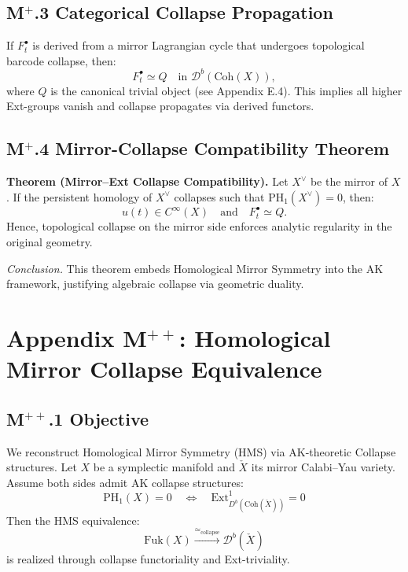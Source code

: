 \documentclass[11pt]{article}
\begin{document}
\begin{axiom}
\begin{axiom}
{{\subsection*{M$^+$.3 Categorical Collapse Propagation}
If \( F^\bullet_t \) is derived from a mirror Lagrangian cycle that undergoes topological barcode collapse, then:
\[
F^\bullet_t \simeq Q \quad \text{in } \mathcal{D}^b(\mathrm{Coh}(X)),
\]
where \( Q \) is the canonical trivial object (see Appendix E.4). This implies all higher Ext-groups vanish and collapse propagates via derived functors.

\subsection*{M$^+$.4 Mirror-Collapse Compatibility Theorem}
\textbf{Theorem (Mirror–Ext Collapse Compatibility).}  
Let \( X^\vee \) be the mirror of \( X \). If the persistent homology of \( X^\vee \) collapses such that \( \mathrm{PH}_1(X^\vee) = 0 \), then:
\[
u(t) \in C^\infty(X) \quad \text{and} \quad F^\bullet_t \simeq Q.
\]
Hence, topological collapse on the mirror side enforces analytic regularity in the original geometry.

\textit{Conclusion.} This theorem embeds Homological Mirror Symmetry into the AK framework, justifying algebraic collapse via geometric duality.


\section*{Appendix M$^{++}$: Homological Mirror Collapse Equivalence}

\subsection*{M$^{++}$.1 Objective}

We reconstruct Homological Mirror Symmetry (HMS) via AK-theoretic Collapse structures.  
Let \( X \) be a symplectic manifold and \( \check{X} \) its mirror Calabi–Yau variety.  
Assume both sides admit AK collapse structures:
\[
\mathrm{PH}_1(X) = 0 \quad \Leftrightarrow \quad \mathrm{Ext}^1_{D^b(\mathrm{Coh}(\check{X}))} = 0
\]
Then the HMS equivalence:
\[
\mathrm{Fuk}(X) \xrightarrow{\simeq_{\text{collapse}}} \mathcal{D}^b(\check{X})
\]
is realized through collapse functoriality and Ext-triviality.

}}
\end{axiom}
\end{axiom}
\end{document}
